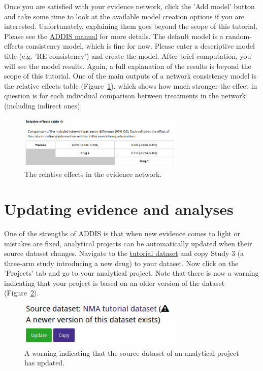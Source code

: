 \documentclass[12pt]{article}
\begin{document}
Once you are satisfied with your evidence network, click the 'Add model' button and take some time to look at the available model creation options if you are interested.
Unfortunately, explaining them goes beyond the scope of this tutorial.
Please see the \href{https://addis.drugis.org/manual.html#model-creation}{ADDIS manual} for more details.
The default model is a random-effects consistency model, which is fine for now.
Please enter a descriptive model title (e.g. 'RE consistency') and create the model.
After brief computation, you will see the model results.
Again, a full explanation of the results is beyond the scope of this tutorial.
One of the main outputs of a network consistency model is the relative effects table (Figure~\ref{fig:relativeEffects}), which shows how much stronger the effect in question is for each individual comparison between treatments in the network (including indirect ones).

\begin{figure}[!ht]
  \centering
  \includegraphics[width=0.7\textwidth]{img/relativeEffects.png}
  \caption{The relative effects in the evidence network.}
\label{fig:relativeEffects}
\end{figure}

\section{Updating evidence and analyses}

One of the strengths of ADDIS is that when new evidence comes to light or mistakes are fixed, analytical projects can be automatically updated when their source dataset changes.
Navigate to the \href{https://addis.drugis.org/#/users/12/datasets/c190e953-051c-4cf5-ac10-332984a14a43}{tutorial dataset} and copy Study 3 (a three-arm study introducing a new drug) to your dataset.
Now click on the 'Projects' tab and go to your analytical project.
Note that there is now a warning indicating that your project is based on an older version of the dataset (Figure~\ref{fig:updateWarning}).

\begin{figure}[!ht]
  \centering
  \includegraphics[width=0.7\textwidth]{img/updateWarning.png}
  \caption{A warning indicating that the source dataset of an analytical project has updated.}
\label{fig:updateWarning}
\end{figure}
\end{document}
